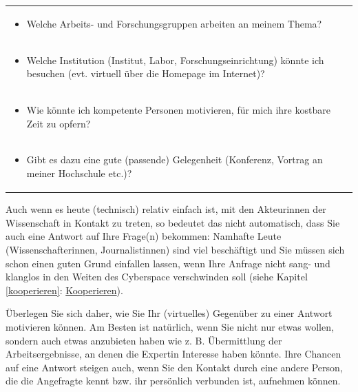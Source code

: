 \documentclass[]{book}
\providecommand{\tightlist}{%
  \setlength{\itemsep}{0pt}\setlength{\parskip}{0pt}}
\theoremstyle{definition}
\theoremstyle{definition}
\theoremstyle{definition}
\theoremstyle{remark}
\begin{document}
\begin{longtable}[]{@{}l@{}}
\begin{minipage}[t]{0.97\columnwidth}
\begin{itemize}
\tightlist
\item
  Welche Arbeits- und Forschungsgruppen arbeiten an meinem Thema?
  \vspace{-6mm}
\end{itemize}\strut
\end{minipage}\tabularnewline
\begin{minipage}[t]{0.97\columnwidth}\raggedright\strut
\begin{itemize}
\tightlist
\item
  Welche Institution (Institut, Labor, Forschungseinrichtung) könnte ich
  besuchen (evt. virtuell über die Homepage im Internet)? \vspace{-6mm}
\end{itemize}\strut
\end{minipage}\tabularnewline
\begin{minipage}[t]{0.97\columnwidth}\raggedright\strut
\begin{itemize}
\tightlist
\item
  Wie könnte ich kompetente Personen motivieren, für mich ihre kostbare
  Zeit zu opfern? \vspace{-6mm}
\end{itemize}\strut
\end{minipage}\tabularnewline
\begin{minipage}[t]{0.97\columnwidth}\raggedright\strut
\begin{itemize}
\tightlist
\item
  Gibt es dazu eine gute (passende) Gelegenheit (Konferenz, Vortrag an
  meiner Hochschule etc.)?
\end{itemize}\strut
\end{minipage}\tabularnewline
\bottomrule
\end{longtable}

Auch wenn es heute (technisch) relativ einfach ist, mit den Akteurinnen
der Wissenschaft in Kontakt zu treten, so bedeutet das nicht
automatisch, dass Sie auch eine Antwort auf Ihre Frage(n) bekommen:
Namhafte Leute (Wissenschafterinnen, Journalistinnen) sind viel
beschäftigt und Sie müssen sich schon einen guten Grund einfallen
lassen, wenn Ihre Anfrage nicht sang- und klanglos in den Weiten des
Cyberspace verschwinden soll (siehe Kapitel \ref{kooperieren}:
\protect\hyperlink{kooperieren}{Kooperieren}).

Überlegen Sie sich daher, wie Sie Ihr (virtuelles) Gegenüber zu einer
Antwort motivieren können. Am Besten ist natürlich, wenn Sie nicht nur
etwas wollen, sondern auch etwas anzubieten haben wie z. B. Übermittlung
der Arbeitsergebnisse, an denen die Expertin Interesse haben könnte.
Ihre Chancen auf eine Antwort steigen auch, wenn Sie den Kontakt durch
eine andere Person, die die Angefragte kennt bzw. ihr persönlich
verbunden ist, aufnehmen können.
\end{document}
